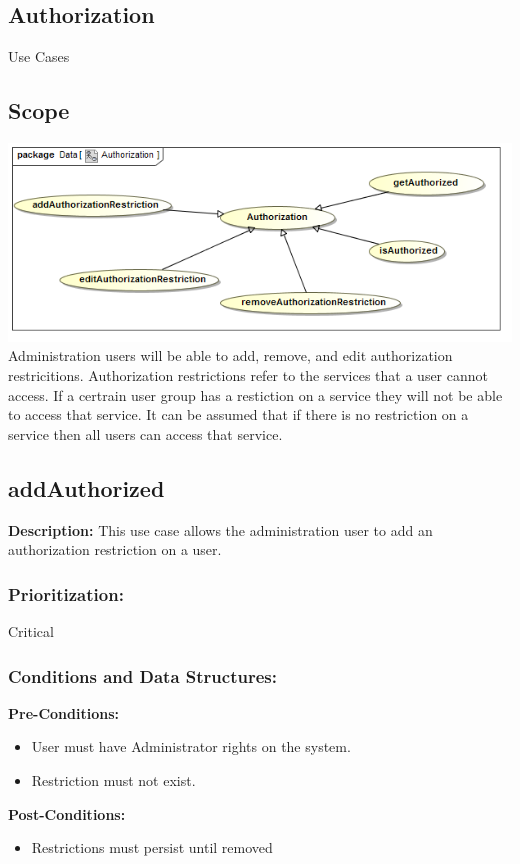 \newpage
\setlength{\voffset}{-3cm}

\begin{center}
\section{\textbf{\huge{Authorization}}}

\Large{Use Cases}
\end{center}

\subsection{Scope}
\includegraphics[width=1\linewidth]{./Graphics/Authorization}
Administration  users will be able to add, remove, and edit authorization restricitions. Authorization restrictions refer to the services that a user cannot access. If a certrain user group has a restiction on a service they will not be able to access that service. It can be assumed that if there is no restriction on a service then all users can access that service.


\subsection{addAuthorized}
\textbf{Description:}
This use case allows the administration user to add an authorization restriction on a user.
\subsubsection{Prioritization:}
Critical
\subsubsection{Conditions and Data Structures:}
\textbf{Pre-Conditions:}
\begin{itemize}
	\item User must have Administrator rights on  the system.
	\item Restriction must not exist.
\end{itemize}
\textbf{Post-Conditions:}
\begin{itemize}
	\item Restrictions must persist until removed
\end{itemize}
